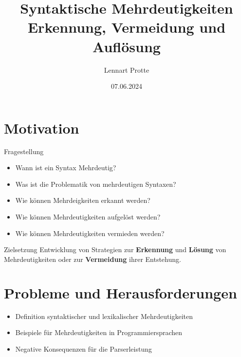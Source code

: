 \documentclass[t]{beamer}
\begin{document}

	\title{Syntaktische Mehrdeutigkeiten \\ Erkennung, Vermeidung und Auflösung}
	\date{07.06.2024}
	\author{Lennart Protte}

	\frame{\titlepage}


	\section{Motivation}\label{sec:motivation}
	\begin{frame}
		\begin{block}{Fragestellung}
			\begin{itemize}
				\item Wann ist ein Syntax Mehrdeutig?
				\item Was ist die Problematik von mehrdeutigen Syntaxen?
				\item Wie können Mehrdeigkeiten erkannt werden?
				\item Wie können Mehrdeutigkeiten aufgelöst werden?
				\item Wie können Mehrdeutigkeiten vermieden werden?
			\end{itemize}
		\end{block}
		\begin{block}{Zielsetzung}
			Entwicklung von Strategien zur \textbf{Erkennung} und \textbf{Lösung} von Mehrdeutigkeiten
			oder zur \textbf{Vermeidung} ihrer Entstehung.
		\end{block}
	\end{frame}


	\section{Probleme und Herausforderungen}\label{sec:probleme-und-herausforderungen}
	\begin{frame}
		\begin{itemize}
			\item Definition syntaktischer und lexikalischer Mehrdeutigkeiten
			\item Beispiele für Mehrdeutigkeiten in Programmiersprachen
			\item Negative Konsequenzen für die Parserleistung
		\end{itemize}
	\end{frame}
\end{document}
